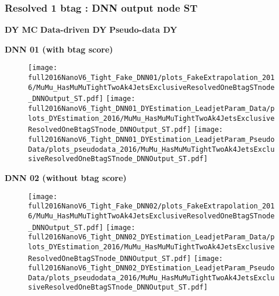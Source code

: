\documentclass[9pt]{beamer}
\begin{document}
\begin{frame}
	\frametitle{Resolved 1 btag : DNN output node ST}
    \hspace{2cm} \textbf{DY MC} \hspace{1.9cm} \textbf{Data-driven DY} \hspace{1cm} \textbf{Pseudo-data DY}
    \begin{center}
        \textbf{DNN 01 (with btag score)}
    \end{center}
	\begin{figure}
		\texttt{[image: full2016NanoV6\_Tight\_Fake\_DNN01/plots\_FakeExtrapolation\_2016/MuMu\_HasMuMuTightTwoAk4JetsExclusiveResolvedOneBtagSTnode\_DNNOutput\_ST.pdf]}
		\texttt{[image: full2016NanoV6\_Tight\_DNN01\_DYEstimation\_LeadjetParam\_Data/plots\_DYEstimation\_2016/MuMu\_HasMuMuTightTwoAk4JetsExclusiveResolvedOneBtagSTnode\_DNNOutput\_ST.pdf]}
		\texttt{[image: full2016NanoV6\_Tight\_DNN01\_DYEstimation\_LeadjetParam\_PseudoData/plots\_pseudodata\_2016/MuMu\_HasMuMuTightTwoAk4JetsExclusiveResolvedOneBtagSTnode\_DNNOutput\_ST.pdf]}
	\end{figure}
    \begin{center}
        \textbf{DNN 02 (without btag score)}
    \end{center}
	\begin{figure}
		\texttt{[image: full2016NanoV6\_Tight\_Fake\_DNN02/plots\_FakeExtrapolation\_2016/MuMu\_HasMuMuTightTwoAk4JetsExclusiveResolvedOneBtagSTnode\_DNNOutput\_ST.pdf]}
		\texttt{[image: full2016NanoV6\_Tight\_DNN02\_DYEstimation\_LeadjetParam\_Data/plots\_DYEstimation\_2016/MuMu\_HasMuMuTightTwoAk4JetsExclusiveResolvedOneBtagSTnode\_DNNOutput\_ST.pdf]}
		\texttt{[image: full2016NanoV6\_Tight\_DNN02\_DYEstimation\_LeadjetParam\_PseudoData/plots\_pseudodata\_2016/MuMu\_HasMuMuTightTwoAk4JetsExclusiveResolvedOneBtagSTnode\_DNNOutput\_ST.pdf]}
	\end{figure}
\end{frame}
\end{document}
